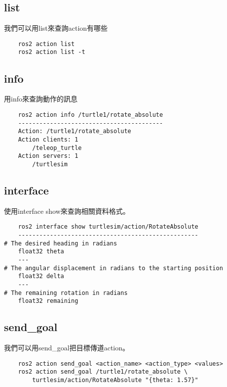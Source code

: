 \subsection{list}
我們可以用list來查詢action有哪些
\begin{verbatim}
    ros2 action list
    ros2 action list -t
\end{verbatim}

\subsection{info}
用info來查詢動作的訊息
\begin{verbatim}
    ros2 action info /turtle1/rotate_absolute
    -----------------------------------------
    Action: /turtle1/rotate_absolute
    Action clients: 1
        /teleop_turtle
    Action servers: 1
        /turtlesim
\end{verbatim}

\subsection{interface}
使用interface show來查詢相關資料格式。
\begin{verbatim}
    ros2 interface show turtlesim/action/RotateAbsolute
    ---------------------------------------------------
# The desired heading in radians
    float32 theta
    ---
# The angular displacement in radians to the starting position
    float32 delta
    ---
# The remaining rotation in radians
    float32 remaining
\end{verbatim}

\subsection{send\_goal}
我們可以用send\_goal把目標傳道action。
\begin{verbatim}
    ros2 action send_goal <action_name> <action_type> <values>
    ros2 action send_goal /turtle1/rotate_absolute \
        turtlesim/action/RotateAbsolute "{theta: 1.57}"
\end{verbatim}
